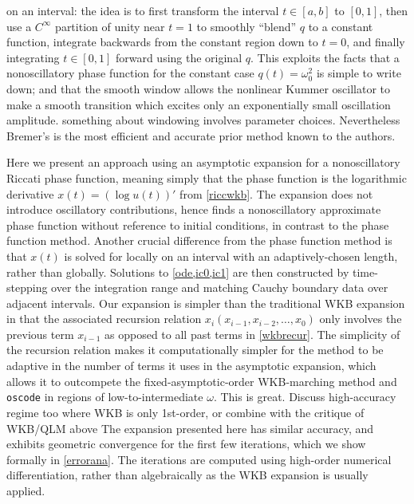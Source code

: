 \documentclass[10pt]{article}
\newcommand{\om}{\omega}
\newcommand{\AB}[1]{{\color{orange}#1}}
\begin{document}
on an interval:
the idea is to first transform the interval $t \in [a,b]$ to $[0, 1]$, then use a $C^\infty$ partition of unity near $t=1$ to smoothly ``blend'' $q$ to
a constant function, integrate backwards from the constant region
down to $t = 0$, and finally integrating $t \in [0,1]$ forward using the original $q$.
This exploits the facts that a nonoscillatory phase function for
the constant case $q(t) = \om_0^2$ is simple to write down; and
that the smooth window allows
the nonlinear Kummer oscillator to make a smooth 
transition which excites only an exponentially small oscillation amplitude.
\AB{something about windowing involves parameter choices.
  Nevertheless Bremer's is the most efficient
  and accurate prior method known to the authors.}

Here we present an approach using an asymptotic expansion for a nonoscillatory Riccati phase function,
meaning simply that the
phase function is the logarithmic derivative $x(t) = (\log u(t))'$ from \cref{riccwkb}.
%
The expansion does not introduce oscillatory contributions,
hence finds a nonoscillatory approximate phase function without
reference to initial conditions, in contrast to the phase function method.
%
Another crucial difference from the phase function method is that $x(t)$ is solved for
locally on an interval with an adaptively-chosen length, rather than globally.
Solutions to \cref{ode,ic0,ic1} are then constructed by time-stepping over the
integration range and matching Cauchy boundary data over adjacent intervals.
%
Our expansion is simpler than the traditional WKB expansion in that the
associated recursion relation $x_i(x_{i-1}, x_{i-2}, \ldots, x_0)$ only
involves the previous term $x_{i-1}$ as opposed to all past terms in
\cref{wkbrecur}. 
%
The simplicity of the recursion relation makes it
computationally simpler for the method to be adaptive in the number of terms it
uses in the asymptotic expansion, which allows it to outcompete the
fixed-asymptotic-order WKB-marching method \cite{korner2022wkb,arnold2011wkb}
and \texttt{oscode} \cite{agocs2020efficient,agocs2020dense} in regions of low-to-intermediate $\omega$.
\AB{This is great. Discuss high-accuracy regime too where WKB is only
  1st-order, or combine with the critique of WKB/QLM above}
%
The expansion presented here has similar accuracy, and
exhibits geometric convergence for the first few iterations, which we show
formally in \cref{errorana}. The iterations are computed using high-order
numerical differentiation, rather than algebraically as the WKB expansion is
usually applied.
\end{document}
